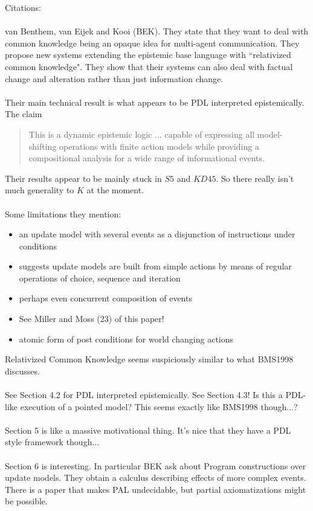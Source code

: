 \documentclass[10pt, a4paper, twoside]{article}
\begin{document}
Citations: \\
\\
van Benthem, van Eijek and Kooi (BEK).
They state that they want to deal with common knowledge being an opaque idea for
multi-agent communication.
They propose new systems extending the epistemic base language with
``relativized common knowledge".
They show that their systems can also deal with factual change and alteration
rather than just information change.\\
\\
Their main technical result is what appears to be PDL interpreted epistemically.
The claim
\begin{quote}
	This is a dynamic epistemic logic $\ldots$ capable of expressing all
	model-shifting operations with finite action models while providing a
	compositional analysis for a wide range of informational events.
\end{quote}
Their results appear to be mainly stuck in $S5$ and $KD45$.
So there really isn't much generality to $K$ at the moment.\\
\\
Some limitations they mention:
\begin{itemize}
	\item an update model with several events as a disjunction of instructions
	under conditions
	\item suggests update models are built from simple actions by means of regular
	operations of choice, sequence and iteration
	\item perhaps even concurrent composition of events
	\item See Miller and Moss (23) of this paper!
	\item atomic form of post conditions for world changing actions
\end{itemize}
Relativized Common Knowledge seems suspiciously similar to what BMS1998
discusses.\\
\\
See Section 4.2 for PDL interpreted epistemically.
See Section 4.3!
Is this a PDL-like execution of a pointed model?
This seems exactly like BMS1998 though...?\\
\\
Section 5 is like a massive motivational thing.
It's nice that they have a PDL style framework though...\\
\\
Section 6 is interesting.
In particular BEK ask about Program constructions over update models.
They obtain a calculus describing effects of more complex events.
There is a paper that makes PAL undecidable, but partial axiomatizations might
be possible.
\end{document}
